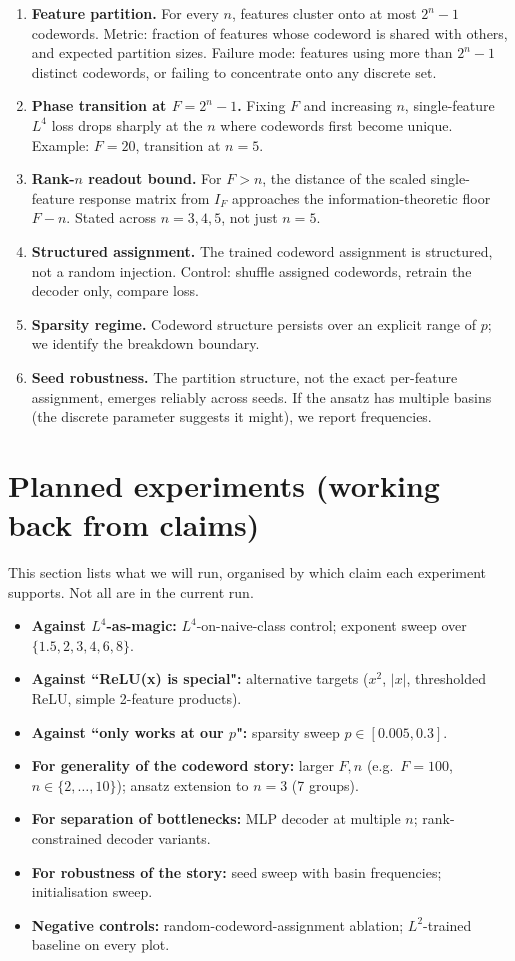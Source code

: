 \documentclass[11pt]{article}
\begin{document}
\begin{enumerate}
\item \textbf{Feature partition.} For every $n$, features cluster onto at most $2^n - 1$ codewords.
Metric: fraction of features whose codeword is shared with others, and expected partition sizes.
Failure mode: features using more than $2^n - 1$ distinct codewords, or failing to concentrate onto any discrete set.
\item \textbf{Phase transition at $F = 2^n - 1$.}
Fixing $F$ and increasing $n$, single-feature $L^4$ loss drops sharply at the $n$ where codewords first become unique.
Example: $F = 20$, transition at $n = 5$.
\item \textbf{Rank-$n$ readout bound.}
For $F > n$, the distance of the scaled single-feature response matrix from $I_F$ approaches the information-theoretic floor $F - n$.
Stated across $n = 3, 4, 5$, not just $n = 5$.
\item \textbf{Structured assignment.}
The trained codeword assignment is structured, not a random injection.
Control: shuffle assigned codewords, retrain the decoder only, compare loss.
\item \textbf{Sparsity regime.}
Codeword structure persists over an explicit range of $p$; we identify the breakdown boundary.
\item \textbf{Seed robustness.}
The partition structure, not the exact per-feature assignment, emerges reliably across seeds.
If the ansatz has multiple basins (the discrete parameter suggests it might), we report frequencies.
\end{enumerate}

\section{Planned experiments (working back from claims)}

This section lists what we will run, organised by which claim each experiment supports.
Not all are in the current run.

\begin{itemize}
\item \textbf{Against $L^4$-as-magic:} $L^4$-on-naive-class control; exponent sweep over $\{1.5, 2, 3, 4, 6, 8\}$.
\item \textbf{Against ``ReLU(x) is special":} alternative targets ($x^2$, $|x|$, thresholded ReLU, simple 2-feature products).
\item \textbf{Against ``only works at our $p$":} sparsity sweep $p \in [0.005, 0.3]$.
\item \textbf{For generality of the codeword story:} larger $F, n$ (e.g.\ $F = 100$, $n \in \{2, \ldots, 10\}$); ansatz extension to $n = 3$ (7 groups).
\item \textbf{For separation of bottlenecks:} MLP decoder at multiple $n$; rank-constrained decoder variants.
\item \textbf{For robustness of the story:} seed sweep with basin frequencies; initialisation sweep.
\item \textbf{Negative controls:} random-codeword-assignment ablation; $L^2$-trained baseline on every plot.
\end{itemize}
\end{document}
